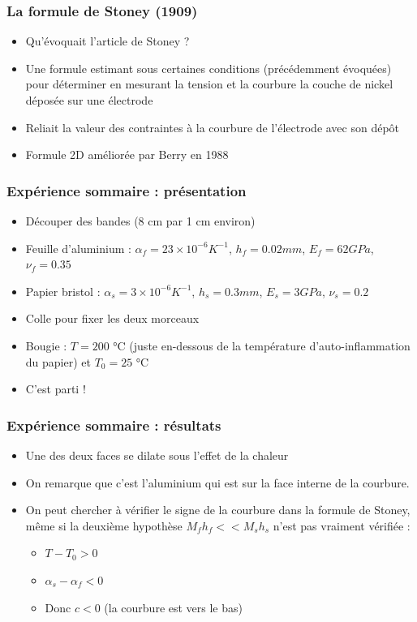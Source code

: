 \documentclass{beamer}
\begin{document}
\begin{frame}
    \frametitle{La formule de Stoney (1909)}

    \begin{itemize}
        \item Qu'évoquait l'article de Stoney ?
        \item Une formule estimant sous certaines conditions (précédemment évoquées) pour déterminer en mesurant la tension et la courbure la couche de nickel déposée sur une électrode 
        \item Reliait la valeur des contraintes à la courbure de l'électrode avec son dépôt
        \item Formule 2D améliorée par Berry en 1988
    \end{itemize}
    
\end{frame}

\begin{frame}
\frametitle{Expérience sommaire : présentation}
\begin{itemize}
    \item Découper des bandes (8 cm par 1 cm environ)
    \item Feuille d'aluminium : $\alpha_f = 23 \times 10^{-6} K^{-1}$, $h_f = 0.02 mm$, $E_f = 62 GPa$, $\nu_f = 0.35$
    \item Papier bristol : $\alpha_s = 3 \times 10^{-6} K^{-1}$, $h_s = 0.3 mm$, $E_s = 3 GPa$, $\nu_s = 0.2$
    \item Colle pour fixer les deux morceaux
    \item Bougie : $T = 200$ °C (juste en-dessous de la température d'auto-inflammation du papier) et $T_0 = 25$ °C
    \item C'est parti !
\end{itemize}
\end{frame}

\begin{frame}
\frametitle{Expérience sommaire : résultats}
    \begin{itemize}
        \item Une des deux faces se dilate sous l'effet de la chaleur
        \item On remarque que c'est l'aluminium qui est sur la face interne de la courbure. 
        \item On peut chercher à vérifier le signe de la courbure dans la formule de Stoney, même si la deuxième hypothèse $M_f h_f << M_s h_s$ n'est pas vraiment vérifiée :
        \begin{itemize}    
            \item $T-T_0 > 0$
            \item $\alpha_s - \alpha_f < 0$
            \item Donc $c < 0$ (la courbure est vers le bas)
        \end{itemize}
    \end{itemize}
\end{frame}
\end{document}
